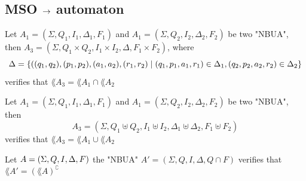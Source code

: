 \documentclass[twoside]{article}
\begin{document}
\subsection{MSO $\rightarrow$ automaton}\label{sec:MSO-Aut}

\begin{lemma}
	Let $A_1 = (\Sigma, Q_1, I_1, \Delta_1, F_1)$ and $A_1 = (\Sigma, Q_2, I_2, \Delta_2, F_2)$ be two "NBUA", then
	$A_3 =  (\Sigma, Q_1 \times Q_2, I_1 \times I_2, \Delta , F_1 \times F_2)$, where
	\[\Delta = \left\{((q_1,q_2) , (p_1,p_2), (a_1,a_2), (r_1,r_2) \mid  (q_1,p_1,a_1,r_1) \in \Delta_1, (q_2,p_2,a_2,r_2) \in \Delta_2\right\}\]
	verifies that $\lang {A_3} = \lang {A_1} \cap \lang {A_2}$
\end{lemma}

\begin{lemma}
	Let $A_1 = (\Sigma, Q_1, I_1, \Delta_1, F_1)$ and $A_1 = (\Sigma, Q_2, I_2, \Delta_2, F_2)$ be two "NBUA", then
	\[ A_3 = (\Sigma, Q_1 \uplus Q_2, I_1 \uplus I_2, \Delta_1 \uplus \Delta_2, F_1 \uplus F_2) \]
	verifies that $\lang {A_3} = \lang {A_1} \cup \lang {A_2}$
\end{lemma}

\begin{lemma}
	Let $A = (\Sigma, Q, I, \Delta, F)$ the "NBUA" $A' = (\Sigma, Q, I, \Delta, Q \cap F)$
	verifies that $\lang {A'} = (\lang A )^{\complement}$
\end{lemma}
\end{document}
